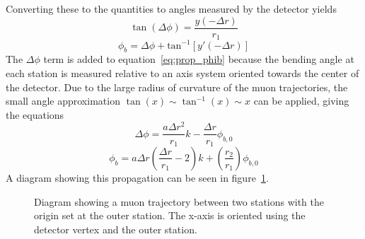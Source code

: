 Converting these to the quantities to angles measured by the detector yields
\begin{equation}
	\label{eq:prop_phi}
	\tan(\Delta\phi)=\frac{y(-\Delta r)}{r_1}
\end{equation}
\begin{equation}
	\label{eq:prop_phib}
	\phi_b=\Delta\phi+\mathrm{tan}^{-1}\left[y'(-\Delta r)\right]
\end{equation}
The $\Delta\phi$ term is added to equation~\ref{eq:prop_phib} because the bending angle at each station is measured relative to an axis system oriented towards the center of the detector. Due to the large radius of curvature of the muon trajectories, the small angle approximation $\tan(x)\sim \tan^{-1}(x)\sim x$ can be applied, giving the equations
\begin{equation}
	\label{eq:prop_phi_approx}
	\Delta\phi=\frac{a\Delta r^2}{r_1}k-\frac{\Delta r}{r_1}\phi_{b,0}
\end{equation}
\begin{equation}
	\label{eq:prop_phib_approx}
	\phi_b=a\Delta r\left(\frac{\Delta r}{r_1}-2\right)k+\left(\frac{r_2}{r_1}\right)\phi_{b,0}
\end{equation}
A diagram showing this propagation can be seen in figure~\ref{fig:mu_trajectory}.

\begin{figure}[h!]
	\centering
	\caption{Diagram showing a muon trajectory between two stations with the origin set at the outer station. The x-axis is oriented using the detector vertex and the outer station.}
	\label{fig:mu_trajectory}
\end{figure}

